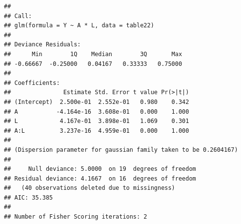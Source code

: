\documentclass[
  10pt,
]{book}
\newenvironment{Shaded}{\begin{snugshade}}{\end{snugshade}}
\newcommand{\AttributeTok}[1]{\textcolor[rgb]{0.77,0.63,0.00}{#1}}
\newcommand{\ConstantTok}[1]{\textcolor[rgb]{0.00,0.00,0.00}{#1}}
\newcommand{\DecValTok}[1]{\textcolor[rgb]{0.00,0.00,0.81}{#1}}
\newcommand{\FunctionTok}[1]{\textcolor[rgb]{0.00,0.00,0.00}{#1}}
\newcommand{\NormalTok}[1]{#1}
\newcommand{\OtherTok}[1]{\textcolor[rgb]{0.56,0.35,0.01}{#1}}
\newcommand{\SpecialCharTok}[1]{\textcolor[rgb]{0.00,0.00,0.00}{#1}}
\begin{document}
\begin{Shaded}
\end{Shaded}

\begin{verbatim}
## 
## Call:
## glm(formula = Y ~ A * L, data = table22)
## 
## Deviance Residuals: 
##      Min        1Q    Median        3Q       Max  
## -0.66667  -0.25000   0.04167   0.33333   0.75000  
## 
## Coefficients:
##               Estimate Std. Error t value Pr(>|t|)
## (Intercept)  2.500e-01  2.552e-01   0.980    0.342
## A           -4.164e-16  3.608e-01   0.000    1.000
## L            4.167e-01  3.898e-01   1.069    0.301
## A:L          3.237e-16  4.959e-01   0.000    1.000
## 
## (Dispersion parameter for gaussian family taken to be 0.2604167)
## 
##     Null deviance: 5.0000  on 19  degrees of freedom
## Residual deviance: 4.1667  on 16  degrees of freedom
##   (40 observations deleted due to missingness)
## AIC: 35.385
## 
## Number of Fisher Scoring iterations: 2
\end{verbatim}

\begin{Shaded}
\end{Shaded}
\end{document}
